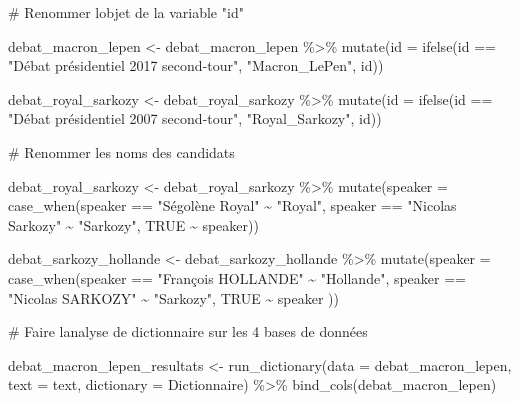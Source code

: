 \documentclass[
  letterpaper,
  DIV=11,
  numbers=noendperiod]{scrartcl}
\newenvironment{Shaded}{\begin{snugshade}}{\end{snugshade}}
\newcommand{\AttributeTok}[1]{\textcolor[rgb]{0.40,0.45,0.13}{#1}}
\newcommand{\CommentTok}[1]{\textcolor[rgb]{0.37,0.37,0.37}{#1}}
\newcommand{\ConstantTok}[1]{\textcolor[rgb]{0.56,0.35,0.01}{#1}}
\newcommand{\FunctionTok}[1]{\textcolor[rgb]{0.28,0.35,0.67}{#1}}
\newcommand{\NormalTok}[1]{\textcolor[rgb]{0.00,0.23,0.31}{#1}}
\newcommand{\OtherTok}[1]{\textcolor[rgb]{0.00,0.23,0.31}{#1}}
\newcommand{\SpecialCharTok}[1]{\textcolor[rgb]{0.37,0.37,0.37}{#1}}
\newcommand{\StringTok}[1]{\textcolor[rgb]{0.13,0.47,0.30}{#1}}
\begin{document}
\begin{Shaded}
\begin{Highlighting}[]
\CommentTok{\# Renommer l\textquotesingle{}objet de la variable "id"}

\NormalTok{debat\_macron\_lepen }\OtherTok{\textless{}{-}}\NormalTok{ debat\_macron\_lepen }\SpecialCharTok{\%\textgreater{}\%} \FunctionTok{mutate}\NormalTok{(}\AttributeTok{id =} \FunctionTok{ifelse}\NormalTok{(id }\SpecialCharTok{==} \StringTok{"Débat présidentiel 2017 second{-}tour"}\NormalTok{, }\StringTok{"Macron\_LePen"}\NormalTok{, id))}

\NormalTok{debat\_royal\_sarkozy }\OtherTok{\textless{}{-}}\NormalTok{ debat\_royal\_sarkozy }\SpecialCharTok{\%\textgreater{}\%} \FunctionTok{mutate}\NormalTok{(}\AttributeTok{id =} \FunctionTok{ifelse}\NormalTok{(id }\SpecialCharTok{==} \StringTok{"Débat présidentiel 2007 second{-}tour"}\NormalTok{, }\StringTok{"Royal\_Sarkozy"}\NormalTok{, id))}

\CommentTok{\# Renommer les noms des candidats}

\NormalTok{debat\_royal\_sarkozy }\OtherTok{\textless{}{-}}\NormalTok{ debat\_royal\_sarkozy }\SpecialCharTok{\%\textgreater{}\%} \FunctionTok{mutate}\NormalTok{(}\AttributeTok{speaker =} \FunctionTok{case\_when}\NormalTok{(speaker }\SpecialCharTok{==} \StringTok{"Ségolène Royal"} \SpecialCharTok{\textasciitilde{}} \StringTok{"Royal"}\NormalTok{, speaker }\SpecialCharTok{==} \StringTok{"Nicolas Sarkozy"} \SpecialCharTok{\textasciitilde{}} \StringTok{"Sarkozy"}\NormalTok{, }\ConstantTok{TRUE} \SpecialCharTok{\textasciitilde{}}\NormalTok{ speaker))}

\NormalTok{debat\_sarkozy\_hollande }\OtherTok{\textless{}{-}}\NormalTok{ debat\_sarkozy\_hollande }\SpecialCharTok{\%\textgreater{}\%} \FunctionTok{mutate}\NormalTok{(}\AttributeTok{speaker =} \FunctionTok{case\_when}\NormalTok{(speaker }\SpecialCharTok{==} \StringTok{"François HOLLANDE"} \SpecialCharTok{\textasciitilde{}} \StringTok{"Hollande"}\NormalTok{, speaker }\SpecialCharTok{==} \StringTok{"Nicolas SARKOZY"} \SpecialCharTok{\textasciitilde{}} \StringTok{"Sarkozy"}\NormalTok{, }\ConstantTok{TRUE} \SpecialCharTok{\textasciitilde{}}\NormalTok{ speaker ))}

\CommentTok{\# Faire l\textquotesingle{}analyse de dictionnaire sur les 4 bases de données}

\NormalTok{debat\_macron\_lepen\_resultats }\OtherTok{\textless{}{-}} \FunctionTok{run\_dictionary}\NormalTok{(}\AttributeTok{data =}\NormalTok{ debat\_macron\_lepen, }\AttributeTok{text =}\NormalTok{ text, }\AttributeTok{dictionary =}\NormalTok{ Dictionnaire) }\SpecialCharTok{\%\textgreater{}\%} \FunctionTok{bind\_cols}\NormalTok{(debat\_macron\_lepen)}
\end{Highlighting}
\end{Shaded}
\end{document}

